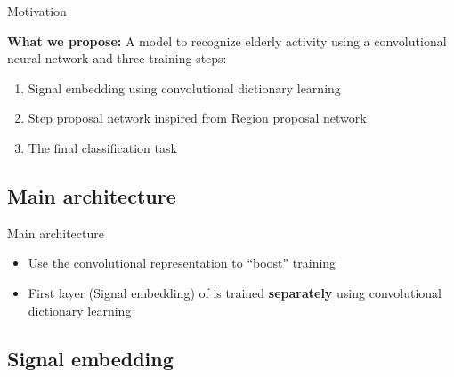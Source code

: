 \begin{frame}{Motivation}{}
\medskip

    \textbf{What we propose:} A model to recognize elderly activity using a convolutional neural network and three training steps:
        \begin{enumerate}
            \item Signal embedding using convolutional dictionary learning
            \item Step proposal network inspired from Region proposal network
            \item The final classification task
        \end{enumerate}


\end{frame}

\subsection{Main architecture}

\begin{frame}{Main architecture}{}

    
\begin{itemize}
    \item Use the convolutional representation to ``boost'' training
    \item First layer (Signal embedding) of \algo is trained \textbf{separately} using convolutional dictionary learning
\end{itemize}
\end{frame}

\subsection{Signal embedding}

